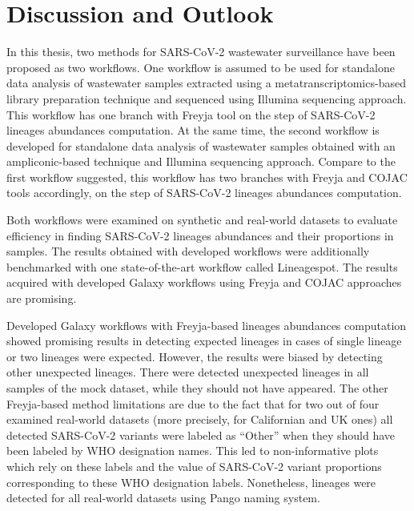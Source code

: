 %
\section{Discussion and Outlook}

In this thesis, two methods for SARS-CoV-2 wastewater surveillance have been proposed as two workflows. One workflow is assumed to be used for standalone data analysis of wastewater samples extracted using a metatranscriptomics-based library preparation technique and sequenced using Illumina sequencing approach. This workflow has one branch with Freyja tool on the step of SARS-CoV-2 lineages abundances computation. At the same time, the second workflow is developed for standalone data analysis of wastewater samples obtained with an ampliconic-based technique and Illumina sequencing approach. Compare to the first workflow suggested, this workflow has two branches with Freyja and COJAC tools accordingly, on the step of SARS-CoV-2 lineages abundances computation.

Both workflows were examined on synthetic and real-world datasets to evaluate efficiency in finding SARS-CoV-2 lineages abundances and their proportions in samples. The results obtained with developed workflows were additionally benchmarked with one state-of-the-art workflow called Lineagespot. The results acquired with developed Galaxy workflows using Freyja and COJAC approaches are promising.

Developed Galaxy workflows with Freyja-based lineages abundances computation showed promising results in detecting expected lineages in cases of single lineage or two lineages were expected. However, the results were biased by detecting other unexpected lineages. There were detected unexpected lineages in all samples of the mock dataset, while they should not have appeared. The other Freyja-based method limitations are due to the fact that for two out of four examined real-world datasets (more precisely, for Californian and UK ones) all detected SARS-CoV-2 variants were labeled as “Other” when they should have been labeled by WHO designation names. This led to non-informative plots which rely on these labels and the value of SARS-CoV-2 variant proportions corresponding to these WHO designation labels. Nonetheless, lineages were detected for all real-world datasets using Pango naming system.

